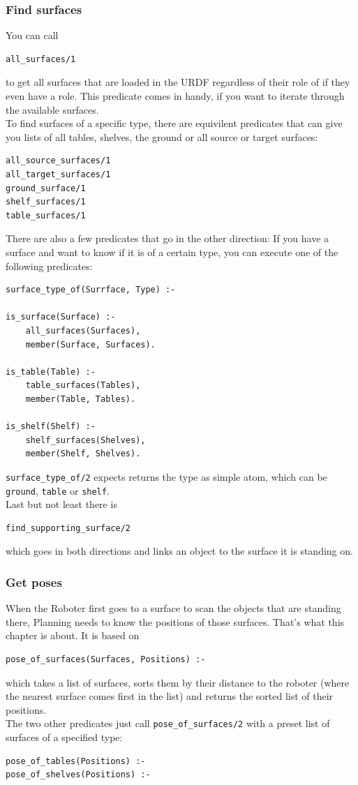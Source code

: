 \documentclass[main.tex]{subfiles}
\begin{document}
\subsubsection{Find surfaces}

You can call
\begin{lstlisting}
all_surfaces/1
\end{lstlisting}
to get all surfaces that are loaded in the URDF regardless of their role of if they even have a role. This predicate comes in handy, if you want to iterate through the available surfaces.\\
To find surfaces of a specific type, there are equivilent predicates that can give you lists of all tables, shelves, the ground or all source or target surfaces:
\begin{lstlisting}
all_source_surfaces/1
all_target_surfaces/1
ground_surface/1
shelf_surfaces/1
table_surfaces/1
\end{lstlisting}

There are also a few predicates that go in the other direction: If you have a surface and want to know if it is of a certain type, you can execute one of the following predicates:
\begin{lstlisting}
surface_type_of(Surrface, Type) :-

is_surface(Surface) :-
    all_surfaces(Surfaces),
    member(Surface, Surfaces).

is_table(Table) :-
    table_surfaces(Tables),
    member(Table, Tables).

is_shelf(Shelf) :-
    shelf_surfaces(Shelves),
    member(Shelf, Shelves).
\end{lstlisting}
\texttt{surface\_type\_of/2} expects returns the type as simple atom, which can be \texttt{ground}, \texttt{table} or \texttt{shelf}.\\
Last but not least there is 
\begin{lstlisting}
find_supporting_surface/2
\end{lstlisting}
which goes in both directions and links an object to the surface it is standing on.

\subsubsection{Get poses}
When the Roboter first goes to a surface to scan the objects that are standing there, Planning needs to know the positions of those surfaces. That's what this chapter is about. It is based on
\begin{lstlisting}
pose_of_surfaces(Surfaces, Positions) :-
\end{lstlisting}
which takes a list of surfaces, sorts them by their distance to the roboter (where the nearest surface comes first in the list) and returns the sorted list of their positions.\\
The two other predicates just call \texttt{pose\_of\_surfaces/2} with a preset list of surfaces of a specified type:
\begin{lstlisting}
pose_of_tables(Positions) :-
pose_of_shelves(Positions) :-
\end{lstlisting}
\end{document}

